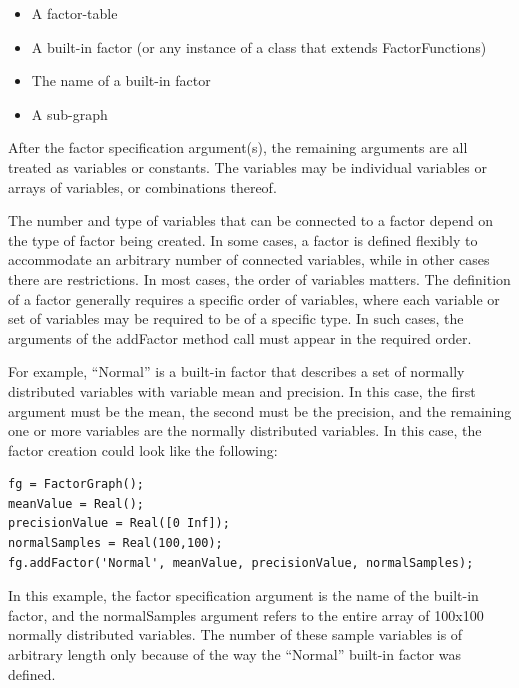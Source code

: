 \fi

\ifjava

\begin{itemize}
\item A factor-table
\item A built-in factor (or any instance of a class that extends FactorFunctions)
\item The name of a built-in factor
\item A sub-graph
\end{itemize}

\fi

After the factor specification argument(s), the remaining arguments are all treated as variables or constants.   \ifmatlab The variables may be individual variables or arrays of variables, or combinations thereof. \fi

The number and type of variables that can be connected to a factor depend on the type of factor being created.  In some cases, a factor is defined flexibly to accommodate an arbitrary number of connected variables, while in other cases there are restrictions.  In most cases, the order of variables matters.  The definition of a factor generally requires a specific order of variables, where each variable or set of variables may be required to be of a specific type.  In such cases, the arguments of the addFactor method call must appear in the required order.

For example, ``Normal'' is a built-in factor that describes a set of normally distributed variables with variable mean and precision.  In this case, the first argument must be the mean, the second must be the precision, and the remaining one or more variables are the normally distributed variables.  In this case, the factor creation could look like the following:

\ifmatlab

\begin{lstlisting}
fg = FactorGraph();
meanValue = Real();
precisionValue = Real([0 Inf]);
normalSamples = Real(100,100);
fg.addFactor('Normal', meanValue, precisionValue, normalSamples);
\end{lstlisting}


In this example, the factor specification argument is the name of the built-in factor, and the normalSamples argument refers to the entire array of 100x100 normally distributed variables.  The number of these sample variables is of arbitrary length only because of the way the ``Normal'' built-in factor was defined. 

